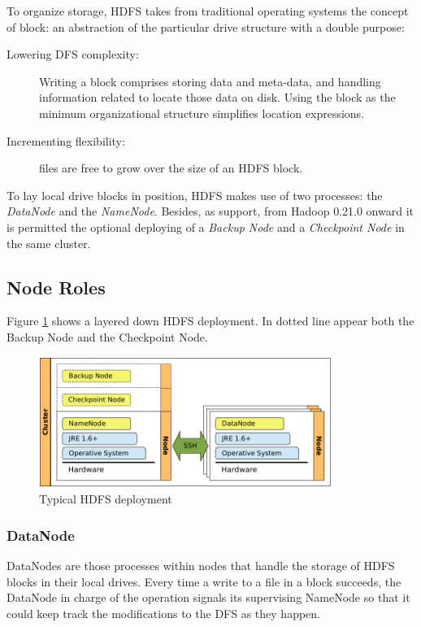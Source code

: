 To organize storage, HDFS takes from traditional operating systems the concept of block: an abstraction of the particular drive structure with a double purpose:

\begin{description}
 \item[Lowering DFS complexity:] Writing a block comprises storing data and meta-data, and handling information related to locate those data on disk. Using the block as the minimum organizational structure simplifies location expressions.
 \item[Incrementing flexibility:] files are free to grow over the size of an HDFS block.
\end{description}

To lay local drive blocks in position, HDFS makes use of two processes: the \emph{DataNode} and the \emph{NameNode}. Besides, as support, from Hadoop 0.21.0 onward it is permitted the optional deploying of a \emph{Backup Node} and a \emph{Checkpoint Node} in the same cluster.

\subsection{Node Roles}\label{subsec:rolesnodos}
\noindent Figure \ref{fig:desplieguehdfs} shows a layered down HDFS deployment. In dotted line appear both the Backup Node and the Checkpoint Node.

\begin{figure}[tbp]
\begin{center}
\includegraphics[width=0.85\textwidth]{imagenes/017.pdf}
 \caption{Typical HDFS deployment}
\label{fig:desplieguehdfs}
\end{center}
\end{figure}

\subsubsection{DataNode}\label{subsubsec:datanode}
\noindent DataNodes are those processes within nodes that handle the storage of HDFS blocks in their local drives. Every time a write to a file in a block succeeds, the DataNode in charge of the operation signals its supervising NameNode so that it could keep track the modifications to the DFS as they happen.

